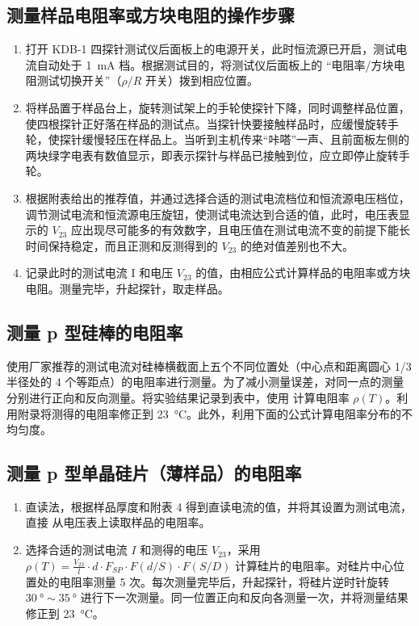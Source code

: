 \documentclass[a4paper,utf8]{article}
\begin{document}
    \subsection{测量样品电阻率或方块电阻的操作步骤}
    \begin{enumerate}
        \item 打开 KDB-1 四探针测试仪后面板上的电源开关，此时恒流源已开启，测试电流自动处于 \SI{1}{\milli\ampere} 档。根据测试目的，将测试仪后面板上的 “电阻率/方块电阻测试切换开关”（$\rho/R$ 开关）拨到相应位置。
        \item 将样品置于样品台上，旋转测试架上的手轮使探针下降，同时调整样品位置，使四根探针正好落在样品的测试点。当探针快要接触样品时，应缓慢旋转手轮，使探针缓慢轻压在样品上。当听到主机传来“咔嗒”一声、且前面板左侧的两块绿字电表有数值显示，即表示探针与样品已接触到位，应立即停止旋转手轮。
        \item 根据附表给出的推荐值，并通过选择合适的测试电流档位和恒流源电压档位，调节测试电流和恒流源电压旋钮，使测试电流达到合适的值，此时，电压表显示的 $V_{23}$ 应出现尽可能多的有效数字，且电压值在测试电流不变的前提下能长时间保持稳定，而且正测和反测得到的 $V_{23}$ 的绝对值差别也不大。
        \item 记录此时的测试电流 I 和电压 $V_{23}$ 的值，由相应公式计算样品的电阻率或方块电阻。测量完毕，升起探针，取走样品。
    \end{enumerate}
    \subsection{测量 p 型硅棒的电阻率}
        使用厂家推荐的测试电流对硅棒横截面上五个不同位置处（中心点和距离圆心 1/3 半径处的 4 个等距点）的电阻率进行测量。为了减小测量误差，对同一点的测量分别进行正向和反向测量。将实验结果记录到表中，使用 计算电阻率 $\rho (T)$。利用附录将测得的电阻率修正到 \SI{23}{\degreeCelsius}。此外，利用下面的公式计算电阻率分布的不均匀度。
    \subsection{测量 p 型单晶硅片（薄样品）的电阻率}
        \begin{enumerate}
            \item 直读法，根据样品厚度和附表 4 得到直读电流的值，并将其设置为测试电流，直接
            从电压表上读取样品的电阻率。
            \item 选择合适的测试电流 $I$ 和测得的电压 $V_{23}$，采用 $\rho(T)=\frac{V_{23}}l\cdot d\cdot F_{SP}\cdot F(d/S)\cdot F(S/D)$ 计算硅片的电阻率。对硅片中心位置处的电阻率测量 5 次。每次测量完毕后，升起探针，将硅片逆时针旋转 $\SI{30}{\degree} \sim  \SI{35}{\degree}$ 进行下一次测量。同一位置正向和反向各测量一次，并将测量结果修正到 \SI{23}{\degreeCelsius}。
        \end{enumerate}
\end{document}
